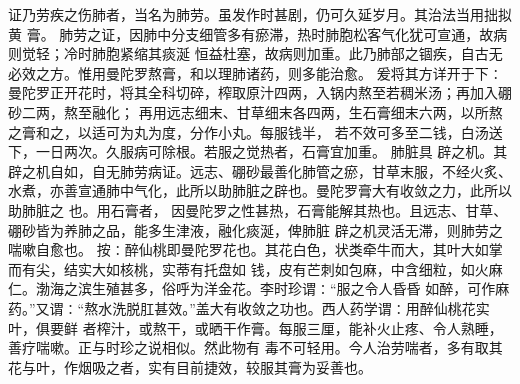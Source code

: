 \documentclass[a4paper,12pt,UTF8,twoside]{ctexbook}
\begin{document}
证乃劳疾之伤肺者，当名为肺劳。虽发作时甚剧，仍可久延岁月。其治法当用拙拟黄 膏。 
肺劳之证，因肺中分支细管多有瘀滞，热时肺胞松客气化犹可宣通，故病则觉轻；冷时肺胞紧缩其痰涎 
恒益杜塞，故病则加重。此乃肺部之锢疾，自古无必效之方。惟用曼陀罗熬膏，和以理肺诸药，则多能治愈。 
爰将其方详开于下∶ 
曼陀罗正开花时，将其全科切碎，榨取原汁四两，入锅内熬至若稠米汤；再加入硼砂二两，熬至融化； 
再用远志细末、甘草细末各四两，生石膏细末六两，以所熬之膏和之，以适可为丸为度，分作小丸。每服钱半， 
若不效可多至二钱，白汤送下，一日两次。久服病可除根。若服之觉热者，石膏宜加重。 
肺脏具 辟之机。其 辟之机自如，自无肺劳病证。远志、硼砂最善化肺管之瘀，甘草末服，不经火炙、 
水煮，亦善宣通肺中气化，此所以助肺脏之辟也。曼陀罗膏大有收敛之力，此所以助肺脏之 也。用石膏者， 
因曼陀罗之性甚热，石膏能解其热也。且远志、甘草、硼砂皆为养肺之品，能多生津液，融化痰涎，俾肺脏 
辟之机灵活无滞，则肺劳之喘嗽自愈也。 
按∶醉仙桃即曼陀罗花也。其花白色，状类牵牛而大，其叶大如掌而有尖，结实大如核桃，实蒂有托盘如 
钱，皮有芒刺如包麻，中含细粒，如火麻仁。渤海之滨生殖甚多，俗呼为洋金花。李时珍谓∶“服之令人昏昏 
如醉，可作麻药。”又谓∶“熬水洗脱肛甚效。”盖大有收敛之功也。西人药学谓∶用醉仙桃花实叶，俱要鲜 
者榨汁，或熬干，或晒干作膏。每服三厘，能补火止疼、令人熟睡，善疗喘嗽。正与时珍之说相似。然此物有 
毒不可轻用。今人治劳喘者，多有取其花与叶，作烟吸之者，实有目前捷效，较服其膏为妥善也。 
\end{document}
